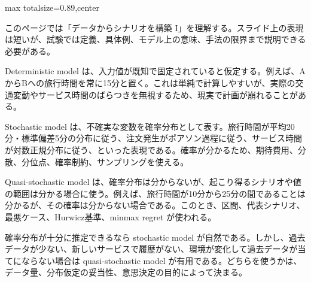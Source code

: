 \begin{minipage}[t]{0.58\textwidth}
\begin{adjustbox}{max totalsize={\textwidth}{0.89\textheight},center}
\begin{minipage}{\textwidth}\scriptsize
{}このページでは「データからシナリオを構築 I」を理解する。スライド上の表現は短いが、試験では定義、具体例、モデル上の意味、手法の限界まで説明できる必要がある。\par
Deterministic model は、入力値が既知で固定されていると仮定する。例えば、AからBへの旅行時間を常に15分と置く。これは単純で計算しやすいが、実際の交通変動やサービス時間のばらつきを無視するため、現実で計画が崩れることがある。\par
Stochastic model は、不確実な変数を確率分布として表す。旅行時間が平均20分・標準偏差5分の分布に従う、注文発生がポアソン過程に従う、サービス時間が対数正規分布に従う、といった表現である。確率が分かるため、期待費用、分散、分位点、確率制約、サンプリングを使える。\par
Quasi-stochastic model は、確率分布は分からないが、起こり得るシナリオや値の範囲は分かる場合に使う。例えば、旅行時間が10分から25分の間であることは分かるが、その確率は分からない場合である。このとき、区間、代表シナリオ、最悪ケース、Hurwicz基準、minmax regret が使われる。\par
確率分布が十分に推定できるなら stochastic model が自然である。しかし、過去データが少ない、新しいサービスで履歴がない、環境が変化して過去データが当てにならない場合は quasi-stochastic model が有用である。どちらを使うかは、データ量、分布仮定の妥当性、意思決定の目的によって決まる。\par

\end{minipage}
\end{adjustbox}
\end{minipage}

